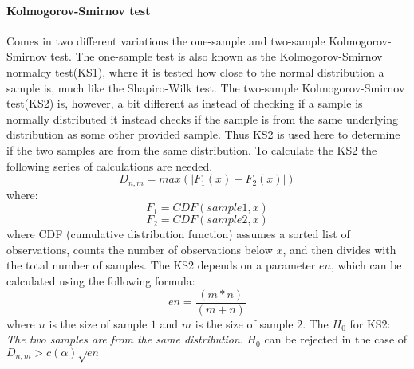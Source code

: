 \paragraph{Kolmogorov-Smirnov test}
Comes in two different variations the one-sample and two-sample Kolmogorov-Smirnov test\cite{massey1951kolmogorov}. The one-sample test is also known as the Kolmogorov-Smirnov normalcy test(KS1), where it is tested how close to the normal distribution a sample is, much like the Shapiro-Wilk test. The two-sample Kolmogorov-Smirnov test(KS2) is, however, a bit different as instead of checking if a sample is normally distributed it instead checks if the sample is from the same underlying distribution as some other provided sample. Thus KS2 is used here to determine if the two samples are from the same distribution. To calculate the KS2 the following series of calculations are needed\cite{massey1951kolmogorov}.
$$D_{n,m} = max(|F_1(x)-F_2(x)|)$$
where:
$$F_1 = CDF(sample1,x)$$
$$F_2 = CDF(sample2,x)$$
where CDF (cumulative distribution function) assumes a sorted list of observations, counts the number of observations below $x$, and then divides with the total number of samples. The KS2 depends on a parameter $en$, which can be calculated using the following formula:
$$en=\frac{(m*n)}{(m+n)}$$
where $n$ is the size of sample $1$ and $m$ is the size of sample $2$.
The $H_0$ for KS2: \textit{The two samples are from the same distribution}.
$H_0$ can be rejected in the case of $D_{n,m} > c(\alpha)\sqrt{en}$\cite{massey1951kolmogorov}
